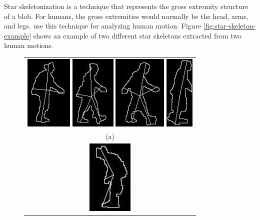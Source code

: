Star skeletonization is a technique that represents the gross
extremity structure of a blob. For humans, the gross extremities would
normally be the head, arms, and legs. 
use this technique for analyzing human
motion. Figure \ref{fig:star-skeleton-example} shows an example of two
different star skeletons extracted from two human motions.

\begin{figure}[t]
  \centering
  \begin{tabular}{c}
    \includegraphics{figures/star-walking-01.jpg} 
    \includegraphics{figures/star-walking-02.jpg} 
    \includegraphics{figures/star-walking-03.jpg} 
    \includegraphics{figures/star-walking-04.jpg} \\
    (a) \\
    \includegraphics{figures/star-sit-01.jpg} 

\end{tabular}
\end{figure}
